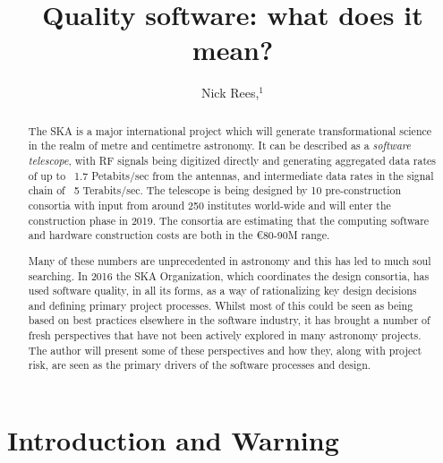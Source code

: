 \documentclass[11pt,twoside]{article}
\begin{document}
\title{Quality software: what does it mean?}

\author{Nick Rees,$^1$
}


\begin{abstract}
The SKA is a major international project which will generate transformational science in the realm of metre and centimetre astronomy. It can be described as a \emph{software telescope}, with RF signals being digitized directly and generating aggregated data rates of up to ~1.7 Petabits/sec from the antennas, and intermediate data rates in the signal chain of ~5 Terabits/sec. The telescope is being designed by 10 pre-construction consortia with input from around 250 institutes world-wide and will enter the construction phase in 2019. The consortia are estimating that the computing software and hardware construction costs are both in the \euro80-90M range. 

Many of these numbers are unprecedented in astronomy and this has led to much soul searching. In 2016 the SKA Organization, which coordinates the design consortia, has used software quality, in all its forms, as a way of rationalizing key design decisions and defining primary project processes. Whilst most of this could be seen as being based on best practices elsewhere in the software industry, it has brought a number of fresh perspectives that have not been actively explored in many astronomy projects. The author will present some of these perspectives and how they, along with project risk, are seen as the primary drivers of the software processes and design.
\end{abstract}

\section{Introduction and Warning} %
\label{sec:introduction_and_warning}
\end{document}

